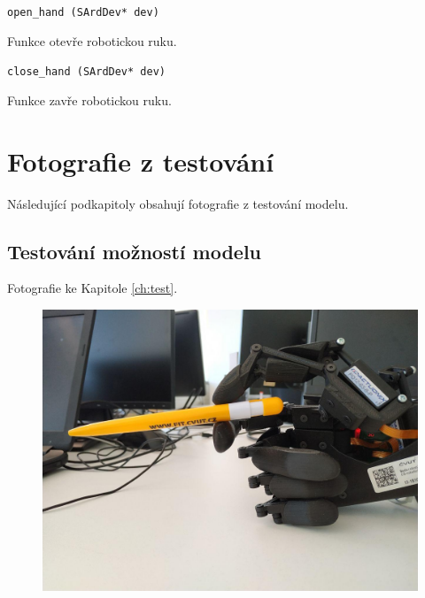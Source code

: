 \documentclass[thesis=B,czech]{FITthesis}[2012/06/26]
\begin{document}
\texttt{open\_hand (SArdDev* dev)}

Funkce otevře robotickou ruku.

\hspace{2cm}

\texttt{close\_hand (SArdDev* dev)}

Funkce zavře robotickou ruku.

\chapter{Fotografie z testování}

Následující podkapitoly obsahují fotografie z testování modelu.

\section{Testování možností modelu}

Fotografie ke Kapitole \ref{ch:test}.

 \begin{figure}[H]
\centering
\includegraphics[scale=0.3]{./image/testF1.jpg}
\end{figure} 
\end{document}
